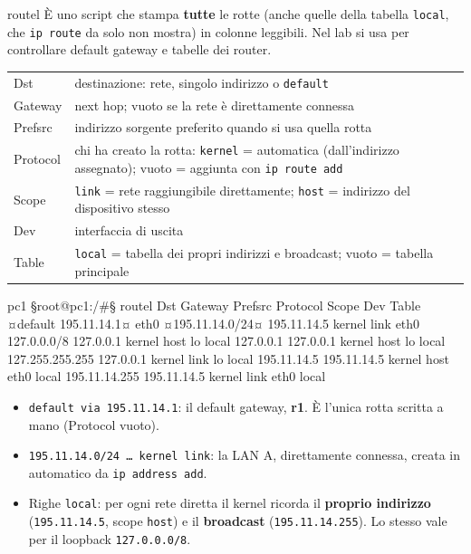 \begin{scheda}{routel}
È uno script che stampa \textbf{tutte} le rotte (anche quelle della tabella \texttt{local}, che \texttt{ip route} da solo non mostra) in colonne leggibili. Nel lab si usa per controllare default gateway e tabelle dei router.
\begin{tabularx}{\linewidth}{>{\ttfamily\small}l Y}
Dst & destinazione: rete, singolo indirizzo o \texttt{default}\\
Gateway & next hop; vuoto se la rete è direttamente connessa\\
Prefsrc & indirizzo sorgente preferito quando si usa quella rotta\\
Protocol & chi ha creato la rotta: \texttt{kernel} = automatica (dall'indirizzo assegnato); vuoto = aggiunta con \texttt{ip route add}\\
Scope & \texttt{link} = rete raggiungibile direttamente; \texttt{host} = indirizzo del dispositivo stesso\\
Dev & interfaccia di uscita\\
Table & \texttt{local} = tabella dei propri indirizzi e broadcast; vuoto = tabella principale\\
\end{tabularx}
\end{scheda}

\begin{terminale}{pc1}
§root@pc1:/#§ routel
Dst             Gateway        Prefsrc      Protocol Scope  Dev   Table
¤default         195.11.14.1¤                                      eth0
¤195.11.14.0/24¤                 195.11.14.5  kernel   link   eth0
127.0.0.0/8                    127.0.0.1    kernel   host   lo    local
127.0.0.1                      127.0.0.1    kernel   host   lo    local
127.255.255.255                127.0.0.1    kernel   link   lo    local
195.11.14.5                    195.11.14.5  kernel   host   eth0  local
195.11.14.255                  195.11.14.5  kernel   link   eth0  local
\end{terminale}
\begin{esempio}
\begin{itemize}
  \item \texttt{default via 195.11.14.1}: il default gateway, \textbf{r1}. È l'unica rotta scritta a mano (Protocol vuoto).
  \item \texttt{195.11.14.0/24 \dots{} kernel link}: la LAN A, direttamente connessa, creata in automatico da \texttt{ip address add}.
  \item Righe \texttt{local}: per ogni rete diretta il kernel ricorda il \textbf{proprio indirizzo} (\texttt{195.11.14.5}, scope \texttt{host}) e il \textbf{broadcast} (\texttt{195.11.14.255}). Lo stesso vale per il loopback \texttt{127.0.0.0/8}.
\end{itemize}
\end{esempio}

